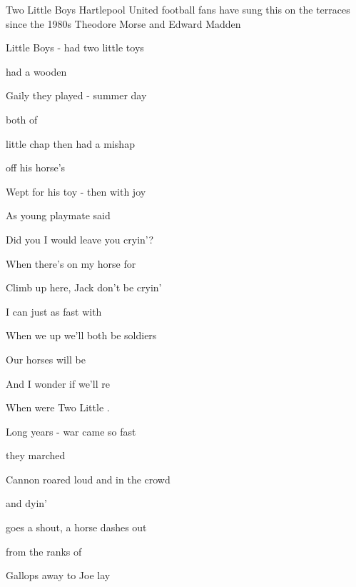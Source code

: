\begin{SBSong}{Two Little Boys}
  {Hartlepool United football fans have sung this on the terraces since the 1980s}
  {Theodore Morse and Edward Madden}
  \begin{SBVerse}
     Little Boys - had two little toys
    
     had a wooden 
    
    Gaily they played -  summer day
    
     both of 
    
     little chap then had a mishap
    
     off his horse's 
    
    Wept for his toy - then  with joy
    
    As  young playmate said 
  \end{SBVerse}
  \begin{SBVerse}
    Did you  I would leave you cryin'?
    
    When there's  on my horse for 
    
    Climb up here, Jack  don't be cryin'
    
    I can  just as fast with 
    
    When we  up we'll both be soldiers
    
    Our horses will  be 
    
    And I wonder if we'll re
    
    When  were Two Little .
  \end{SBVerse}
  \begin{SBVerse}
    Long years  - war came so fast
    
     they marched 
    
    Cannon roared loud and in the  crowd
    
     and dyin' 
    
     goes a shout, a horse dashes out
    
     from the ranks of 
    
    Gallops away to  Joe lay
    

\end{SBVerse}
\end{SBSong}

